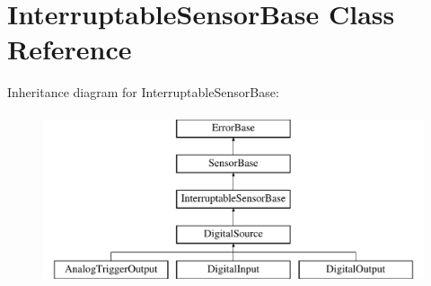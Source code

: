\hypertarget{classInterruptableSensorBase}{
\section{InterruptableSensorBase Class Reference}
\label{classInterruptableSensorBase}
}
Inheritance diagram for InterruptableSensorBase:\begin{figure}[H]
\begin{center}
\leavevmode
\includegraphics[height=5.000000cm]{classInterruptableSensorBase}
\end{center}
\end{figure}
